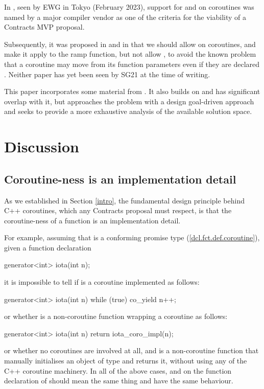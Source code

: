 In \cite{P3173R0}, seen by EWG in Tokyo (February 2023), support for  and  on coroutines was named by a major compiler vendor as one of the criteria for the viability of a Contracts MVP proposal.

Subsequently, it was proposed in \cite{P2957R1} and in \cite{P3251R0} that we should allow  on coroutines, and make it apply to the ramp function, but not allow , to avoid the known problem that a coroutine may move from its function parameters even if they are declared . Neither paper has yet been seen by SG21 at the time of writing.

This paper incorporates some material from \cite{P3251R0}. It also builds on \cite{P2957R1} and has significant overlap with it, but approaches the problem with a design goal-driven approach and seeks to provide a more exhaustive analysis of the available solution space. 

\section{Discussion}

\subsection{Coroutine-ness is an implementation detail}
\label{impldetail}

As we established in Section \ref{intro}, the fundamental design principle behind C++ coroutines, which any Contracts proposal must respect, is that the coroutine-ness of a function  is an implementation detail.

For example, assuming that  is a conforming promise type (\href{https://eel.is/c++draft/dcl.fct.def.coroutine}{[dcl.fct.def.coroutine]}), given a function declaration 
\begin{codeblock}
generator<int> iota(int n); 
\end{codeblock}
it is impossible to tell if  is a coroutine implemented as follows:
\begin{codeblock}
generator<int> iota(int n) {
  while (true)
    co_yield n++;
}
\end{codeblock}
or whether  is a non-coroutine function wrapping a coroutine  as follows:
\begin{codeblock}
generator<int> iota(int n) {
  return iota_coro_impl(n);
}
\end{codeblock}
or whether no coroutines are involved at all, and  is a non-coroutine function that manually initialises an object of type  and returns it, without using any of the C++ coroutine machinery. In all of the above cases,  and  on the function declaration of  should mean the same thing and have the same behaviour.

